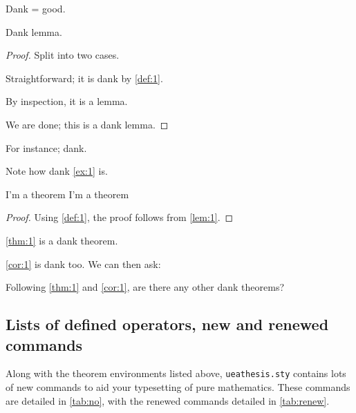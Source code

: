 \begin{definition}\label{def:1} Dank = good.
\end{definition}

\begin{lemma}\label{lem:1} Dank lemma.
\end{lemma}

\begin{proof} Split into two cases. 
\begin{case1} Straightforward; it is dank by \autoref{def:1}.
\end{case1}

\begin{case2} By inspection, it is a lemma.
\end{case2}
We are done; this is a dank lemma. \end{proof}

\begin{example}\label{ex:1} For instance; dank.
\end{example}

\begin{remark} Note how dank \autoref{ex:1} is.
\end{remark}

\begin{theorem}\label{thm:1}
I'm a theorem I'm a theorem
\end{theorem}

\begin{proof} Using \autoref{def:1}, the proof follows from \autoref{lem:1}.
\end{proof}

\begin{corollary}\label{cor:1} \autoref{thm:1} is a dank theorem. \dne
\end{corollary}

\autoref{cor:1} is dank too. We can then ask:

\begin{question} Following \autoref{thm:1} and \autoref{cor:1}, are there any other dank theorems?
\end{question}

\subsection{Lists of defined operators, new and renewed commands}

Along with the theorem environments listed above, \verb|ueathesis.sty| contains lots of new commands to aid your typesetting of pure mathematics. These commands are detailed in \autoref{tab:no}, with the renewed commands detailed in \autoref{tab:renew}.

